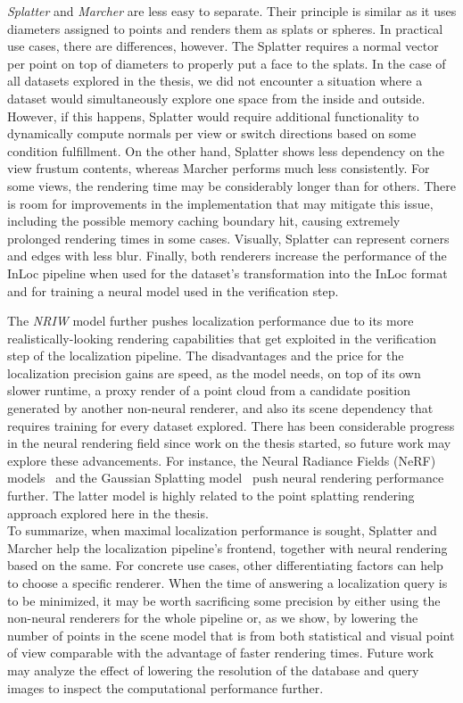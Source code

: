 \emph{Splatter} and \emph{Marcher} are less easy to separate. Their principle
is similar as it uses diameters assigned to points and renders them as splats or
spheres. In practical use cases, there are differences, however.
The Splatter requires a normal vector per point on top of diameters to
properly put a face to the splats. In the case of all datasets explored in the
thesis, we did not encounter a situation where a dataset would simultaneously
explore one space from the inside and outside. However, if this happens, Splatter
would require additional functionality to dynamically compute normals per view
or switch directions based on some condition fulfillment. On the other hand,
Splatter shows less dependency on the view frustum contents, whereas Marcher
performs much less consistently. For some views, the rendering time may be
considerably longer than for others. There is room for improvements in the
implementation that may mitigate this issue, including the possible memory caching
boundary hit, causing extremely prolonged rendering times in some cases. Visually,
Splatter can represent corners and edges with less blur. Finally, both
renderers increase the performance of the InLoc pipeline when used for the
dataset's transformation into the InLoc format and for training a neural model
used in the verification step.

The \emph{NRIW} model further pushes localization performance due to its more
realistically-looking rendering capabilities that get exploited in the verification
step of the localization pipeline. The disadvantages and the price for the localization
precision gains are speed, as the model needs, on top of its own slower runtime,
a proxy render of a point cloud from a candidate position generated by another
non-neural renderer, and also its scene dependency that requires training for
every dataset explored. There has been considerable progress in the neural rendering
field since work on the thesis started, so future work may explore these advancements.
For instance, the Neural Radiance Fields (NeRF) models~\citep{NERF, NERF2} and the
Gaussian Splatting model~\citep{kerbl3Dgaussians} push neural rendering performance
further. The latter model is highly related to the point splatting rendering approach
explored here in the thesis.\\

To summarize, when maximal localization performance is sought, Splatter and Marcher
help the localization pipeline's frontend, together with neural rendering based on the
same. For concrete use cases, other differentiating factors can help to choose a specific
renderer. When the time of answering a localization query is to be minimized, it may be
worth sacrificing some precision by either using the non-neural renderers for the whole
pipeline or, as we show, by lowering the number of points in the scene model that is from
both statistical and visual point of view comparable with the advantage of faster
rendering times. Future work may analyze the effect of lowering the resolution of the
database and query images to inspect the computational performance further.


